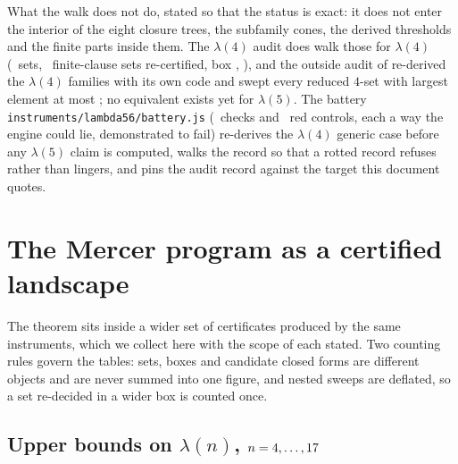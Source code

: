 \documentclass[11pt]{article}
\begin{document}
What the walk does not do, stated so that the status is exact: it does not enter the interior of the eight closure trees, the subfamily cones, the derived thresholds and the finite parts inside them. The $\lambda(4)$ audit does walk those for $\lambda(4)$ (\LfourAuditSets\ sets, \LfourAuditRecert\ finite-clause sets re-certified, box \LfourAuditBox, \LfourAuditDate), and the outside audit of \cite{Audit392} re-derived the $\lambda(4)$ families with its own code and swept every reduced $4$-set with largest element at most \LfourOutsideSweep; no equivalent exists yet for $\lambda(5)$. The battery \texttt{instruments/lambda56/battery.js} (\BatteryPass\ checks and \BatteryReds\ red controls, each a way the engine could lie, demonstrated to fail) re-derives the $\lambda(4)$ generic case before any $\lambda(5)$ claim is computed, walks the record so that a rotted record refuses rather than lingers, and pins the audit record against the target this document quotes.

\section{The Mercer program as a certified landscape}\label{sec:landscape}

The theorem sits inside a wider set of certificates produced by the same instruments, which we collect here with the scope of each stated. Two counting rules govern the tables: sets, boxes and candidate closed forms are different objects and are never summed into one figure, and nested sweeps are deflated, so a set re-decided in a wider box is counted once.

\subsection{Upper bounds on \texorpdfstring{$\lambda(n)$, $n=4,\dots,17$}{lambda(n), n = 4..\LtMaxN}}

\begin{table}[t]\centering\small
{}
\caption{Proposition~\ref{prop:lamtable}: the deepest box per $n$ in \texttt{certs/lambda-table.json}. Every row is an exhaustion with a conservation identity (integer kills at roots of unity, exact dyadic kills, full certification of survivors) that the numbers of this document re-add. ``The earlier table'' is a float-scouted table in the author's laboratory notes, reproduced here with every set decided exactly.}\label{tab:lambda}
\end{table}
\end{document}
